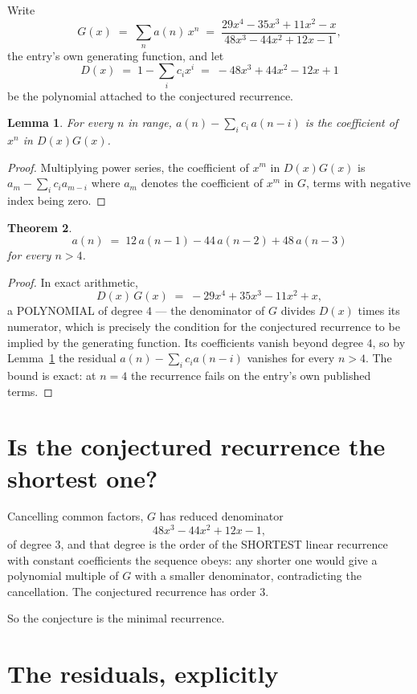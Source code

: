 \documentclass[11pt,a4paper]{article}
\theoremstyle{plain}
\newtheorem{theorem}{Theorem}
\newtheorem{lemma}[theorem]{Lemma}
\theoremstyle{definition}
\begin{document}
Write
\[
G(x)\;=\;\sum_{n}a(n)\,x^{n}\;=\;\frac{29 x^{4} - 35 x^{3} + 11 x^{2} - x}{48 x^{3} - 44 x^{2} + 12 x - 1},
\]
the entry's own generating function, and let
\[
D(x)\;=\;1-\sum_i c_i x^{i}\;=\;- 48 x^{3} + 44 x^{2} - 12 x + 1
\]
be the polynomial attached to the conjectured recurrence.

\begin{lemma}\label{lem:key}
For every $n$ in range, $a(n)-\sum_i c_i\,a(n-i)$ is the coefficient of $x^{n}$ in
$D(x)G(x)$.
\end{lemma}

\begin{proof}
Multiplying power series, the coefficient of $x^{m}$ in $D(x)G(x)$ is
$a_m-\sum_i c_i a_{m-i}$ where $a_m$ denotes the coefficient of $x^{m}$ in $G$, terms with
negative index being zero.
\end{proof}

\begin{theorem}
\[
a(n)\;=\;12\,a(n-1) - 44\,a(n-2) + 48\,a(n-3)
\]
for every $n>4$.
\end{theorem}

\begin{proof}
In exact arithmetic,
\[
D(x)\,G(x)\;=\;- 29 x^{4} + 35 x^{3} - 11 x^{2} + x,
\]
a POLYNOMIAL of degree $4$ --- the denominator of $G$ divides $D(x)$ times its numerator,
which is precisely the condition for the conjectured recurrence to be implied by the
generating function. Its coefficients vanish beyond degree $4$, so by
Lemma~\ref{lem:key} the residual $a(n)-\sum_ic_ia(n-i)$ vanishes for every
$n>4$. The bound is exact: at $n=4$ the recurrence fails on the entry's own published terms.
\end{proof}

\section{Is the conjectured recurrence the shortest one?}

Cancelling common factors, $G$ has reduced denominator
\[
48 x^{3} - 44 x^{2} + 12 x - 1,
\]
of degree $3$, and that degree is the order of the SHORTEST linear recurrence with
constant coefficients the sequence obeys: any shorter one would give a polynomial multiple of
$G$ with a smaller denominator, contradicting the cancellation. The conjectured recurrence has
order $3$.

So the conjecture is the minimal recurrence.

\section{The residuals, explicitly}
\end{document}
